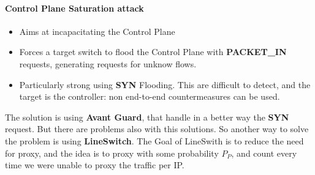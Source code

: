 \paragraph*{Control Plane Saturation attack}
\begin{itemize}
  \item Aims at incapacitating the Control Plane
  \item Forces a target switch to flood the Control Plane with
\textbf{PACKET\_IN} requests, generating requests for unknow flows.
  \item Particularly strong using \textbf{SYN} Flooding. This are difficult to
detect, and the target is the controller: non end-to-end countermeasures can be
used.
\end{itemize}
The solution is using \textbf{Avant Guard}, that handle in a better way the
\textbf{SYN} request. But there are problems also with this solutions. So
another way to solve the problem is using \textbf{LineSwitch}.
The Goal of LineSwith is to reduce the need for proxy, and the idea is to proxy
with some probability $P_P$, and count every time we were unable to proxy the
traffic per IP.

